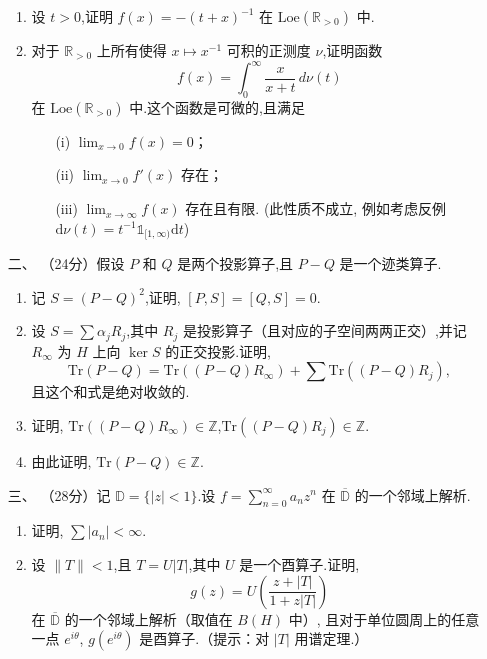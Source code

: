 \begin{enumerate}
\begin{enumerate}[label=(\alph*)]
\item 设 $t>0$,证明 $f(x)=-(t+x)^{-1}$ 在 $\mathrm{Loe}(\mathbb{R}_{>0})$ 中.

\item 对于 $\mathbb{R}_{>0}$ 上所有使得 $x\mapsto x^{-1}$ 可积的正测度 $\nu$,证明函数
$$
f(x)=\int_{0}^{\infty} \frac{x}{x+t}\,d\nu(t)
$$
在 $\mathrm{Loe}(\mathbb{R}_{>0})$ 中.这个函数是可微的,且满足
\begin{itemize}
\item[(i)] $\lim_{x\to 0} f(x)=0$；
\item[(ii)] $\lim_{x\to 0} f'(x)$ 存在；
\item[(iii)] $\lim_{x\to \infty} f(x)$ 存在且有限. (此性质不成立, 例如考虑反例$\mathrm{d}\nu(t)=t^{-1}\mathbb{1}_{[1,\infty)}\mathrm{d}t$)
\end{itemize}
\end{enumerate}

\item[二、]（24分）假设 $P$ 和 $Q$ 是两个投影算子,且 $P-Q$ 是一个迹类算子.

\begin{enumerate}[label=(\alph*)]
\item 记 $S=(P-Q)^2$,证明, $[P,S]=[Q,S]=0$.

\item 设 $S=\sum \alpha_j R_j$,其中 $R_j$ 是投影算子（且对应的子空间两两正交）,并记 $R_\infty$ 为 $H$ 上向 $\ker S$ 的正交投影.证明,
$$
\mathrm{Tr}(P-Q)=\mathrm{Tr}((P-Q)R_\infty)+\sum \mathrm{Tr}((P-Q)R_j),
$$
且这个和式是绝对收敛的.

\item 证明, $\mathrm{Tr}((P-Q)R_\infty)\in \mathbb{Z}$,$\mathrm{Tr}((P-Q)R_j)\in \mathbb{Z}$.

\item 由此证明, $\mathrm{Tr}(P-Q)\in \mathbb{Z}$.
\end{enumerate}

\item[三、]（28分）记 $\mathbb{D}=\{|z|<1\}$.设 $f=\sum_{n=0}^{\infty} a_n z^n$ 在 $\overline{\mathbb{D}}$ 的一个邻域上解析.

\begin{enumerate}[label=(\alph*)]
\item 证明, $\sum |a_n|<\infty$.

\item 设 $\|T\|<1$,且 $T=U|T|$,其中 $U$ 是一个酉算子.证明,
$$
g(z)=U\left(\frac{z+|T|}{1+z|T|}\right)
$$
在 $\overline{\mathbb{D}}$ 的一个邻域上解析（取值在 $B(H)$ 中）,
且对于单位圆周上的任意一点 $e^{i\theta}$, $g(e^{i\theta})$ 是酉算子.（提示：对 $|T|$ 用谱定理.）


\end{enumerate}
\end{enumerate}
